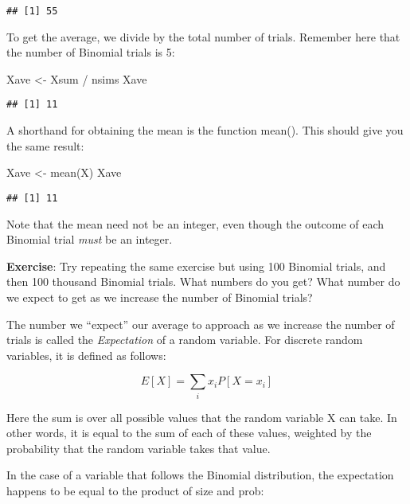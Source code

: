 \documentclass[
]{book}
\newenvironment{Shaded}{\begin{snugshade}}{\end{snugshade}}
\newcommand{\FunctionTok}[1]{\textcolor[rgb]{0.00,0.00,0.00}{#1}}
\newcommand{\NormalTok}[1]{#1}
\newcommand{\OtherTok}[1]{\textcolor[rgb]{0.56,0.35,0.01}{#1}}
\newcommand{\SpecialCharTok}[1]{\textcolor[rgb]{0.00,0.00,0.00}{#1}}
\begin{document}
\begin{verbatim}
## [1] 55
\end{verbatim}

To get the average, we divide by the total number of trials. Remember here that the number of Binomial trials is 5:

\begin{Shaded}
\begin{Highlighting}[]
\NormalTok{Xave }\OtherTok{\textless{}{-}}\NormalTok{ Xsum }\SpecialCharTok{/}\NormalTok{ nsims}
\NormalTok{Xave}
\end{Highlighting}
\end{Shaded}

\begin{verbatim}
## [1] 11
\end{verbatim}

A shorthand for obtaining the mean is the function mean(). This should give you the same result:

\begin{Shaded}
\begin{Highlighting}[]
\NormalTok{Xave }\OtherTok{\textless{}{-}} \FunctionTok{mean}\NormalTok{(X)}
\NormalTok{Xave}
\end{Highlighting}
\end{Shaded}

\begin{verbatim}
## [1] 11
\end{verbatim}

Note that the mean need not be an integer, even though the outcome of each Binomial trial \emph{must} be an integer.

\textbf{Exercise}: Try repeating the same exercise but using 100 Binomial trials, and then 100 thousand Binomial trials. What numbers do you get? What number do we expect to get as we increase the number of Binomial trials?

The number we ``expect'' our average to approach as we increase the number of trials is called the \emph{Expectation} of a random variable. For discrete random variables, it is defined as follows:

\[E[X] = \sum_{i}x_iP[X=x_i]\]

Here the sum is over all possible values that the random variable X can take. In other words, it is equal to the sum of each of these values, weighted by the probability that the random variable takes that value.

In the case of a variable that follows the Binomial distribution, the expectation happens to be equal to the product of size and prob:
\end{document}
